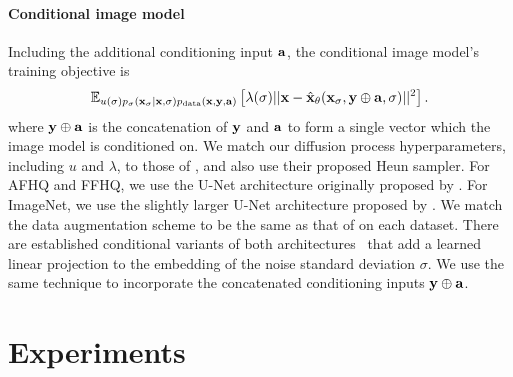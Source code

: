 \paragraph{Conditional image model}
Including the additional conditioning input ${\mathbf{a}}$, the conditional image model's training objective is
\begin{equation}
\label{eq:conditional-image-model-objective}
    \mathbb{E}_{u(\sigma)p_\sigma({\mathbf{x}}_\sigma|{\mathbf{x}},\sigma)p_{\rm{data}}({\mathbf{x}},{\mathbf{y}},{\mathbf{a}})} \left[ \lambda(\sigma) \lvert\lvert {\mathbf{x}} - \hat{{\mathbf{x}}}_\theta({\mathbf{x}}_\sigma, {\mathbf{y}} \oplus {\mathbf{a}}, \sigma) \rvert\rvert^2 \right].
\end{equation}
where ${\mathbf{y}} \oplus {\mathbf{a}}$ is the concatenation of ${\mathbf{y}}$ and ${\mathbf{a}}$ to form a single vector which the image model is conditioned on. We match our diffusion process hyperparameters, including $u$ and $\lambda$, to those of \citet{karras2022elucidating}, and also use their proposed Heun sampler.  For AFHQ and FFHQ, we use the U-Net architecture originally proposed by \citet{song2020score}. For ImageNet, we use the slightly larger U-Net architecture proposed by \citet{dhariwal2021diffusion}. We match the data augmentation scheme to be the same as that of \citet{karras2022elucidating} on each dataset. There are established conditional variants of both architectures~\citep{dhariwal2021diffusion,karras2022elucidating} that add a learned linear projection to the embedding of the noise standard deviation $\sigma$.  We use the same technique to incorporate the concatenated conditioning inputs ${\mathbf{y}}\oplus{\mathbf{a}}$.



\section{Experiments} \label{sec:2sdm-experiments}


